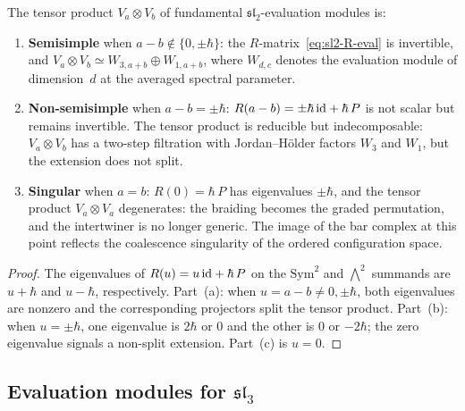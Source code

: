 \begin{corollary}
\label{cor:sl2-clebsch-gordan}
The tensor product $V_a\otimes V_b$ of fundamental
$\mathfrak{sl}_2$-evaluation modules is:
\begin{enumerate}[label=(\alph*)]
\item \textbf{Semisimple} when $a-b\notin\{0,\pm\hbar\}$:
the $R$-matrix~\eqref{eq:sl2-R-eval} is invertible, and
$V_a\otimes V_b\simeq W_{3,a+b}\oplus W_{1,a+b}$,
where $W_{d,c}$ denotes the evaluation module of dimension~$d$
at the averaged spectral parameter.

\item \textbf{Non-semisimple} when $a-b=\pm\hbar$:
$R(a-b)=\pm\hbar\,\mathrm{id}+\hbar\,P$ is not scalar but remains
invertible. The tensor product is reducible but
indecomposable: $V_a\otimes V_b$ has a two-step filtration
with Jordan--H\"older factors $W_3$ and $W_1$, but the
extension does not split.

\item \textbf{Singular} when $a=b$: $R(0)=\hbar\,P$
has eigenvalues $\pm\hbar$, and the tensor product $V_a\otimes V_a$
degenerates: the braiding becomes the graded
permutation, and the intertwiner is no longer generic.
The image of the bar complex at this point reflects the
coalescence singularity of the ordered configuration space.
\end{enumerate}
\end{corollary}

\begin{proof}
The eigenvalues of $R(u)=u\,\mathrm{id}+\hbar\, P$ on the
$\mathrm{Sym}^2$ and $\bigwedge^2$ summands are
$u+\hbar$ and $u-\hbar$, respectively. Part~(a):
when $u=a-b\neq 0,\pm\hbar$, both eigenvalues are nonzero
and the corresponding projectors split the tensor product.
Part~(b): when $u=\pm\hbar$, one eigenvalue is $2\hbar$
or $0$ and the other is $0$ or $-2\hbar$; the zero
eigenvalue signals a non-split extension. Part~(c) is
$u=0$.
\end{proof}

\subsection{Evaluation modules for $\mathfrak{sl}_3$}


